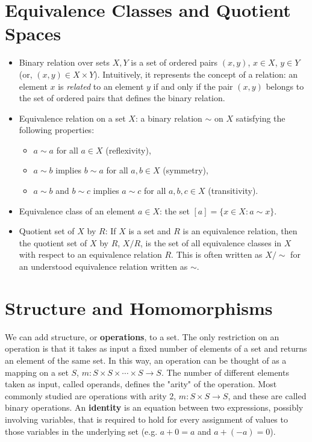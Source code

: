 \section{Equivalence Classes and Quotient Spaces}
\begin{itemize}
    \item Binary relation over sets $X, Y$ is a set of ordered pairs $(x, y)$, $x\in X$, $y\in Y$ (or, $(x, y)\in X\times Y$). Intuitively, it represents the concept of a relation: an element $x$ is \textit{related} to an element $y$ if and only if the pair $(x, y)$ belongs to the set of ordered pairs that defines the binary relation.
    \item Equivalence relation on a set $X$: a binary relation $\sim$ on $X$ satisfying the following properties:
    \begin{itemize}
        \item $a\sim a$ for all $a \in X$ (reflexivity),
        \item $a \sim b$ implies $b \sim a$ for all $a, b\in X$ (symmetry),
        \item $a\sim b$ and $b\sim c$ implies $a\sim c$ for all $a, b, c\in X$ (transitivity).
    \end{itemize}
    \item Equivalence class of an element $a\in X$: the set $[a]=\{x \in X: a\sim x\}$.
    \item Quotient set of $X$ by $R$: If $X$ is a set and $R$ is an equivalence relation, then the quotient set of $X$ by $R$, $X/ R$, is the set of all equivalence classes in $X$ with respect to an equivalence relation $R$. This is often written as $X / \sim$ for an understood equivalence relation written as $\sim$.
\end{itemize}

\section{Structure and Homomorphisms}
We can add structure, or \textbf{operations}, to a set. The only restriction on an operation is that it takes as input a fixed number of elements of a set and returns an element of the same set. In this way, an operation can be thought of as a mapping on a set $S$, $m: S\times S \times \cdots\times S\rightarrow S$. The number of different elements taken as input, called operands, defines the "arity" of the operation. Most commonly studied are operations with arity 2, $m: S\times S\rightarrow S$, and these are called binary operations. An \textbf{identity} is an equation between two expressions, possibly involving variables, that is required to hold for every assignment of values to those variables in the underlying set (e.g. $a + 0= a$ and $a + (-a) = 0$). 

